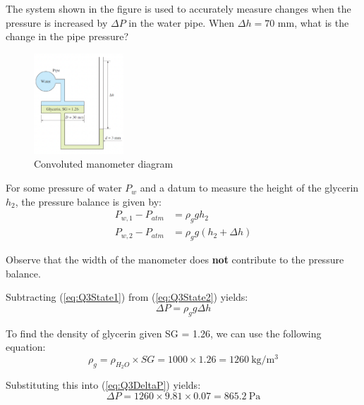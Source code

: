 \section{}
The system shown in the figure is used to accurately measure changes when the pressure 
is increased by $\Delta P$ in the water pipe. When $\Delta h = 70$ mm, what is the change 
in the pipe pressure?

\begin{figure}[h]
    \centering
    \includegraphics[width=0.3\textwidth]{Questions/Figures/Q3ProblemDiagram.png}
    \caption{Convoluted manometer diagram}
    \label{fig:Q3ProblemDiagram}
\end{figure}

For some pressure of water $P_{w}$ and a datum to measure the height of the glycerin $h_2$,
the pressure balance is given by:
\begin{align}
    P_{w, 1} - P_{atm} &= \rho_g g h_2 \label{eq:Q3State1} \\
    P_{w, 2} - P_{atm} &= \rho_g g (h_2 + \Delta h) \label{eq:Q3State2}
\end{align}

Observe that the width of the manometer does \textbf{not} contribute to the pressure balance.

Subtracting (\ref{eq:Q3State1}) from (\ref{eq:Q3State2}) yields:
\begin{equation}
    \Delta P = \rho_g g \Delta h \label{eq:Q3DeltaP}
\end{equation}

To find the density of glycerin given SG = 1.26, we can use the following equation:
\begin{equation}
    \rho_g = \rho_{H_2O} \times SG = 1000 \times 1.26 = \qty{1260}{\kilogram\per\meter\cubed}
\end{equation}

Substituting this into (\ref{eq:Q3DeltaP}) yields:
\begin{equation}
    \Delta P = 1260 \times 
    9.81 \times 0.07 
    = \boxed{\qty{865.2}{\pascal}} \nonumber
\end{equation}
